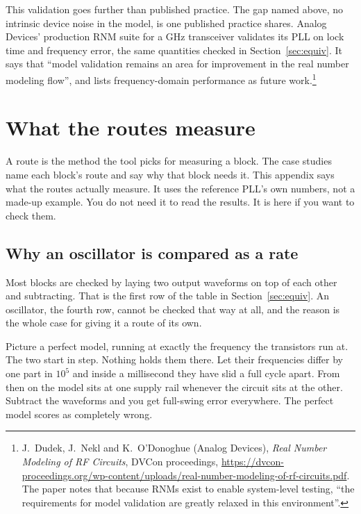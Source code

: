 \documentclass[11pt,a4paper]{article}
\begin{document}
\begin{itemize}[leftmargin=1.5em,itemsep=0.3em]
        This validation goes further than published practice. The gap
        named above, no intrinsic device noise in the model, is one
        published practice shares. Analog Devices' production RNM suite
        for a GHz transceiver validates its PLL on lock time and
        frequency error, the same quantities checked in
        Section~\ref{sec:equiv}. It says that ``model validation
        remains an area for improvement in the real number modeling
        flow'', and lists frequency-domain performance as future
        work.\footnote{J.~Dudek, J.~Nekl and K.~O'Donoghue (Analog Devices),
        \emph{Real Number Modeling of RF Circuits}, DVCon proceedings,
        \url{https://dvcon-proceedings.org/wp-content/uploads/real-number-modeling-of-rf-circuits.pdf}. The paper notes that because RNMs exist to
        enable system-level testing, ``the requirements for model
        validation are greatly relaxed in this environment''.}
\end{itemize}


\appendix
\section{What the routes measure}
\label{app:routes}

A route is the method the tool picks for measuring a block. The case
studies name each block's route and say why that block needs it. This
appendix says what the routes actually measure. It uses the reference
PLL's own numbers, not a made-up example. You do not need it to read
the results. It is here if you want to check them.

\subsection{Why an oscillator is compared as a rate}

Most blocks are checked by laying two output waveforms on top of each
other and subtracting. That is the first row of the table in
Section~\ref{sec:equiv}. An oscillator, the fourth row, cannot be
checked that way at all, and the reason is the whole case for giving it
a route of its own.

Picture a perfect model, running at exactly the frequency the
transistors run at. The two start in step. Nothing holds them there.
Let their frequencies differ by one part in $10^5$ and inside a
millisecond they have slid a full cycle apart. From then on the model
sits at one supply rail whenever the circuit sits at the other.
Subtract the waveforms and you get full-swing error everywhere. The
perfect model scores as completely wrong.
\end{document}
